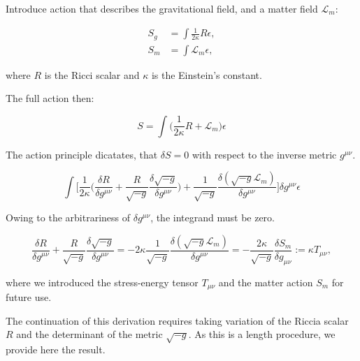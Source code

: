 {    Introduce action that describes the gravitational field, and a matter field $\mathcal{L}_m$:
    
    \begin{align}
        S_g &= \int\frac{1}{2\kappa}R\epsilon, \\
        S_m &= \int\mathcal{L}_{m}\epsilon,
    \end{align}
    
    where $R$ is the Ricci scalar and $\kappa$ is the  Einstein's constant.
    
    The full action then:
    
    \begin{equation}
        S = \int\Big(\frac{1}{2\kappa}R+\mathcal{L}_m\Big)\epsilon
    \end{equation}
    
    The action principle dicatates, that $\delta S = 0$  with respect to the inverse metric $g^{\mu\nu}$. 
    
    \begin{equation}
        \int\Bigg[\frac{1}{2\kappa}\Big(\frac{\delta R}{\delta g^{\mu\nu}}+\frac{R}{\sqrt{-g}}\frac{\delta\sqrt{-g}}{\delta g^{\mu\nu}}\Big) + \frac{1}{\sqrt{-g}}\frac{\delta(\sqrt{-g}\mathcal{L}_m)}{\delta g^{\mu\nu}}\Bigg]\delta g^{\mu\nu}\epsilon
    \end{equation}
    
    Owing to the arbitrariness of $\delta g^{\mu\nu}$, the integrand must be zero. 
    
    \begin{equation}
        \frac{\delta R}{\delta g^{\mu\nu}} + \frac{R}{\sqrt{-g}}\frac{\delta\sqrt{-g}}{\delta g^{\mu\nu}} = -2\kappa\frac{1}{\sqrt{-g}}\frac{\delta(\sqrt{-g}\mathcal{L}_m)}{\delta g^{\mu\nu}} = -\frac{2\kappa}{\sqrt{-g}}\frac{\delta S_m}{\delta g_{\mu\nu}} := \kappa T_{\mu\nu},
    \label{eq:theory:action1}
    \end{equation}
    
    where we introduced the stress-energy tensor $T_{\mu\nu}$ and the matter action $S_m$ for future use. \\
    
    
    The continuation of this derivation requires taking variation of the Riccia scalar $R$ and the determinant of the metric $\sqrt{-g}$. 
    As this is a length procedure, we provide here the result. 
    
}
